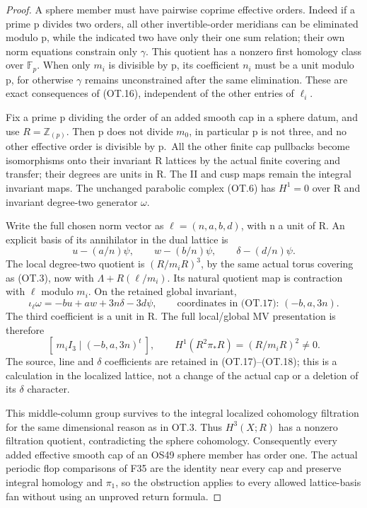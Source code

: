 \begin{proof}
A sphere member must have pairwise coprime effective orders. Indeed if a
prime p divides two orders, all other invertible-order meridians can be
eliminated modulo p, while the indicated two have only their one sum
relation; their own norm equations constrain only \(\gamma\). This quotient
has a nonzero first homology class over \(\mathbb F_p\). When only \(m_i\) is divisible
by p, its coefficient \(n_i\) must be a unit modulo p, for otherwise \(\gamma\)
remains unconstrained after the same elimination. These are exact
consequences of (OT.16), independent of the other entries of \(\ell_i\).

Fix a prime p dividing the order of an added smooth cap in a sphere datum,
and use \(R=\mathbb Z_{(p)}\). Then p does not divide \(m_0\), in particular p is not three,
and no other effective order is divisible by p.~All the other finite
cap pullbacks become isomorphisms onto their invariant R lattices by
the actual finite covering and transfer; their degrees are units in R.
The II and cusp maps remain the integral invariant maps. The unchanged
parabolic complex (OT.6) has \(H^1=0\) over R and invariant degree-two
generator \(\omega\).

Write the full chosen norm vector as \(\ell=(n,a,b,d)\), with n a unit of R.
An explicit basis of its annihilator in the dual lattice is
\[
 u-(a/n)\psi,\qquad w-(b/n)\psi,
                         \qquad\delta-(d/n)\psi.          \tag{OT.17}
\]
The local degree-two quotient is \((R/m_iR)^3\), by the same actual torus
covering as (OT.3), now with \(\Lambda+R(\ell/m_i)\). Its natural quotient map
is contraction with \(\ell\) modulo \(m_i\). On the retained global invariant,
\[
 \iota_\ell\omega=-b u+a w+3n\delta-3d\psi,
 \qquad\text{coordinates in (OT.17): }(-b,a,3n).           \tag{OT.18}
\]
The third coefficient is a unit in R. The full local/global MV
presentation is therefore
\[
            [\ m_i I_3\mid(-b,a,3n)^t\ ],
 \qquad H^1(R^2\pi_*R)=(R/m_iR)^2\ne0.                 \tag{OT.19}
\]
The source, line and \(\delta\) coefficients are retained in (OT.17)--(OT.18);
this is a calculation in the localized lattice, not a change of the
actual cap or a deletion of its \(\delta\) character.

This middle-column group survives to the integral localized cohomology
filtration for the same dimensional reason as in OT.3. Thus \(H^3(X;R)\)
has a nonzero filtration quotient, contradicting the sphere cohomology.
Consequently every added effective smooth cap of an OS49 sphere member
has order one. The actual periodic flop comparisons of F35 are the
identity near every cap and preserve integral homology and \(\pi_1\), so the
obstruction applies to every allowed lattice-basis fan without using an
unproved return formula.


\end{proof}

